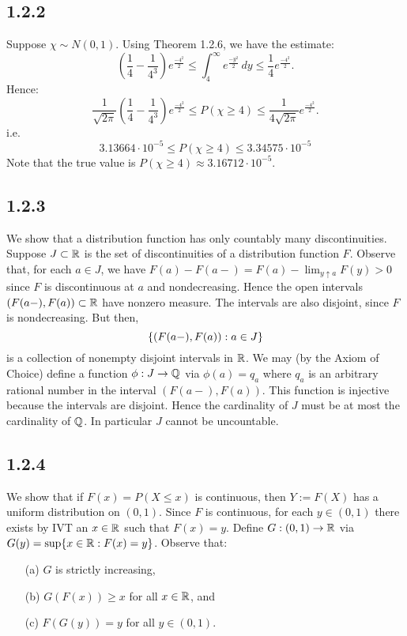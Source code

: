 \documentclass[11pt]{article}
\begin{document}
\subsection*{1.2.2}

Suppose $\chi \sim N(0,1)$. Using Theorem 1.2.6, we have the estimate: \[\left(\frac{1}{4} - \frac{1}{4^3}\right)e^{\frac{-4^2}{2}} \leq \int_4^\infty e^{\frac{-y^2}{2}} \,dy \leq \frac{1}{4}e^{\frac{-4^2}{2}}.\] Hence: \[\frac{1}{\sqrt{2\pi}}\left(\frac{1}{4} - \frac{1}{4^3}\right)e^{\frac{-4^2}{2}}\leq P(\chi \geq 4) \leq \frac{1}{4\sqrt{2\pi}}e^{\frac{-4^2}{2}}.\] i.e. \[3.13664 \cdot 10^{-5}\leq P(\chi \geq 4) \leq 3.34575 \cdot 10^{-5}\] Note that the true value is $P(\chi \geq 4) \approx 3.16712 \cdot 10^{-5}$.

\subsection*{1.2.3}

We show that a distribution function has only countably many discontinuities. Suppose $J \subset {\mathbb R}$ is the set of discontinuities of a distribution function $F$. Observe that, for each $a \in J$, we have $F(a) - F(a-) = F(a) - \lim_{y\uparrow a} F(y) > 0$ since $F$ is discontinuous at $a$ and nondecreasing. Hence the open intervals $(F(a-), F(a)) \subset {\mathbb R}$ have nonzero measure. The intervals are also disjoint, since $F$ is nondecreasing. But then, \[\{(F(a-), F(a)) : a \in J\}\] is a collection of nonempty disjoint intervals in ${\mathbb R}$. We may (by the Axiom of Choice) define a function $\phi: J \to {\mathbb Q}$ via $\phi(a) = q_a$ where $q_a$ is an arbitrary rational number in the interval $(F(a-), F(a))$. This function is injective because the intervals are disjoint. Hence the cardinality of $J$ must be at most the cardinality of ${\mathbb Q}$. In particular $J$ cannot be uncountable.

\subsection*{1.2.4}

We show that if $F(x) = P(X\leq x)$ is continuous, then $Y := F(X)$ has a uniform distribution on $(0,1)$. Since $F$ is continuous, for each $y \in (0,1)$ there exists by IVT an $x \in {\mathbb R}$ such that $F(x) = y$. Define $G:(0,1) \to {\mathbb R}$ via $G(y) = \sup \{x \in {\mathbb R} : F(x) = y\}$. Observe that: \begin{enumerate}
    \item[(a)] $G$ is strictly increasing, 
    \item[(b)] $G(F(x)) \geq x$ for all $x \in {\mathbb R}$, and 
    \item[(c)] $F(G(y)) = y$ for all $y \in (0,1)$. \end{enumerate}
    
\end{document}
